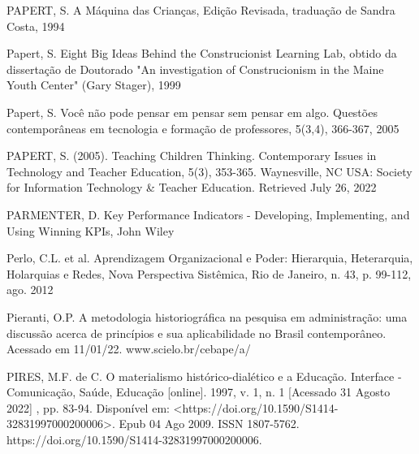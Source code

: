 \begin{flushleft}
[PAPERT, 1994] PAPERT, S. A Máquina das Crianças, Edição Revisada, traduação de Sandra Costa, 1994
\end{flushleft}


\begin{flushleft}
[PAPERT, 1999] Papert, S. Eight Big Ideas Behind the Construcionist Learning Lab, obtido da dissertação de Doutorado "An investigation of Construcionism in the Maine Youth Center" (Gary Stager), 1999
\end{flushleft}


\begin{flushleft}
[PAPERT, 2005a] Papert, S. Você não pode pensar em pensar sem pensar em algo. Questões contemporâneas em tecnologia e formação de professores, 5(3,4), 366-367, 2005
\end{flushleft}


\begin{flushleft}
[PAPERT, 2005] PAPERT, S. (2005). Teaching Children Thinking. Contemporary Issues in Technology and Teacher Education, 5(3), 353-365. Waynesville, NC USA: Society for Information Technology \& Teacher Education. Retrieved July 26, 2022
\end{flushleft}


\begin{flushleft}
[PARMENTER, 2007] PARMENTER, D. Key Performance Indicators - Developing, Implementing, and Using Winning KPIs, John Wiley 
\end{flushleft}


\begin{flushleft}
[PERLO et al., 2012] Perlo, C.L. et al. Aprendizagem Organizacional e Poder: Hierarquia, Heterarquia, Holarquias e Redes, Nova Perspectiva Sistêmica, Rio de Janeiro, n. 43, p. 99-112, ago. 2012
\end{flushleft}


\begin{flushleft}
[PIERANTI, 2022] Pieranti, O.P. A metodologia historiográfica na pesquisa em administração: uma discussão acerca de princípios e sua aplicabilidade no Brasil contemporâneo. Acessado em 11/01/22. www.scielo.br/cebape/a/
\end{flushleft}


\begin{flushleft}
[PIRES, 2009] PIRES, M.F. de C. O materialismo histórico-dialético e a Educação. Interface - Comunicação, Saúde, Educação [online]. 1997, v. 1, n. 1 [Acessado 31 Agosto 2022] , pp. 83-94. Disponível em: <https://doi.org/10.1590/S1414-32831997000200006>. Epub 04 Ago 2009. ISSN 1807-5762. https://doi.org/10.1590/S1414-32831997000200006.
\end{flushleft}



